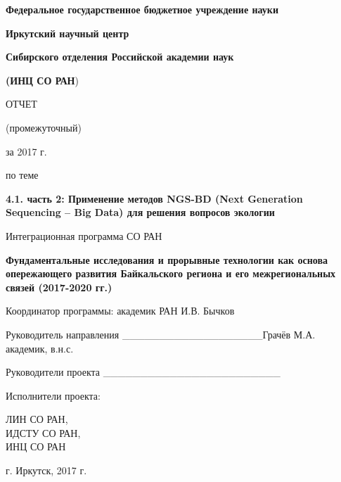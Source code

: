 \documentclass[a4paper,12pt,openany,final]{extreport}
\date{}
\renewcommand{\chaptername}{} %
\begin{document}
\renewcommand{\chaptername}{ГЛАВА}

\begin{titlepage}
\thispagestyle{empty}
\begin{center}

\textbf{Федеральное государственное бюджетное учреждение науки}

\textbf{Иркутский научный центр}

\textbf{Сибирского отделения Российской академии наук}

\textbf{(ИНЦ СО РАН})

\vfill

ОТЧЕТ

(промежуточный)

за 2017 г.

по теме

\textbf{4.1. часть 2: Применение методов NGS-BD (Next Generation
Sequencing -- Big Data) для решения вопросов экологии}
\vspace{2em}

Интеграционная программа СО РАН

\textbf{Фундаментальные исследования и прорывные технологии как основа
опережающего развития Байкальского региона и его межрегиональных связей
(2017-2020 гг.)}
\vspace{1em}

Координатор программы: академик РАН И.В. Бычков
\end{center}
\vspace{1em}

Руководитель направления \_\_\_\_\_\_\_\_\_\_\_\_\_\_\_\_\_\_\_{Грачёв
М.А. академик, в.н.с.}

\vspace{1em}
Руководители проекта \_\_\_\_\_\_\_\_\_\_\_\_\_\_\_\_\_\_\_\_\_\_\_\_

\vspace{1em}
\begin{multicols}{3}
  Исполнители проекта:

  \vfill\null
  \columnbreak

\mbox{}\vfill\null
  \columnbreak

\noindent{}ЛИН СО РАН,\\
ИДСТУ СО РАН,\\
ИНЦ СО РАН
\end{multicols}

\vfill
\begin{center}
г. Иркутск, 2017 г.
\end{center}
\end{titlepage}
\end{document}
